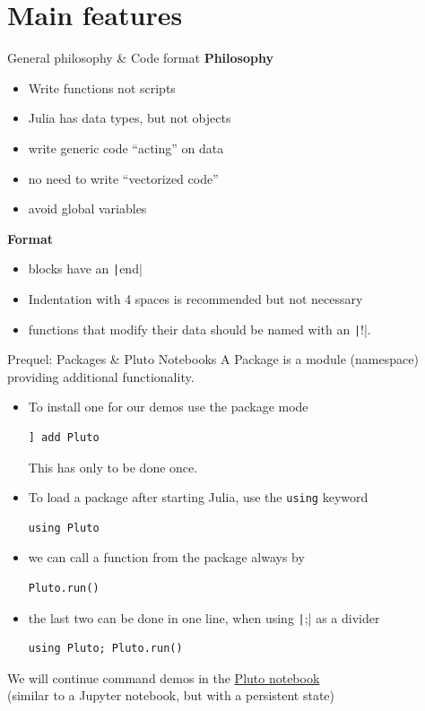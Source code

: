 \documentclass[aspectratio=169, 11pt, handout]{beamer}
\begin{document}
    \section{Main features}
    \begin{frame}{General philosophy \& Code format}
        \alert{\textbf{Philosophy}}
        \begin{itemize}
            \item Write functions not scripts
            \item Julia has data types, but not objects
            \item write generic code “acting” on data
            \item no need to write “vectorized code”
            \item avoid global variables
        \end{itemize}
        \vspace{\baselineskip}
        \pause
        \alert{\textbf{Format}}
        \begin{itemize}
            \item blocks have an \texttt|end|
            \item Indentation with 4 spaces is recommended but not necessary
            \item functions that modify their data should be named with an \texttt|!|.
        \end{itemize}
    \end{frame}
    \begin{frame}[fragile]{Prequel: Packages \& Pluto Notebooks}
        A \alert{Package} is a \alert{module} (namespace) providing additional functionality.

        \begin{itemize}[<+->]
            \item To install one for our demos use the package mode
            \begin{verbatim}
] add Pluto
            \end{verbatim}
            This has only to be done once.
            \item To load a package after starting Julia,
            use the \texttt{using} keyword
            \begin{verbatim}
using Pluto
            \end{verbatim}
            \item we can call a function from the package always by
            \begin{verbatim}
Pluto.run()
            \end{verbatim}
            \item the last two can be done in one line, when using \texttt|;| as a divider
            \begin{verbatim}
using Pluto; Pluto.run()
            \end{verbatim}
        \end{itemize}
        \pause
        We will continue command demos in the \href{https://plutojl.org}{Pluto notebook}
        \\\hfill (similar to a Jupyter notebook, but with a persistent state)
    \end{frame}
\end{document}
